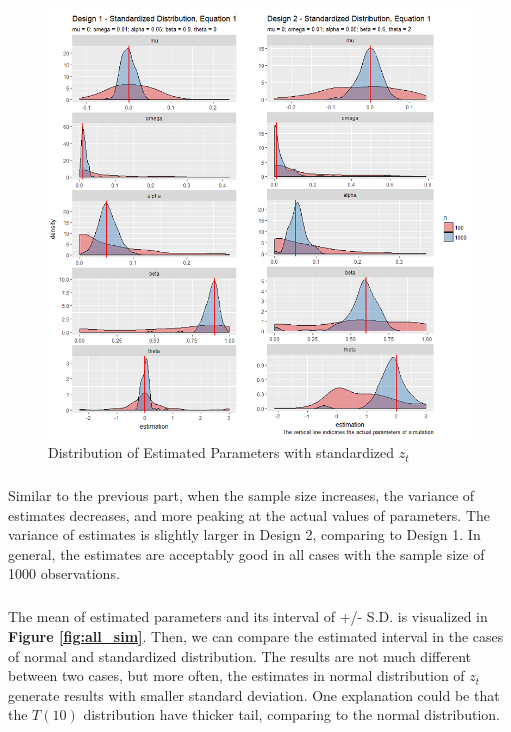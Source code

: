 \documentclass[a4paper]{article}
\begin{document}
\begin{figure}[h]
\centering
\includegraphics[height=0.5\textheight]{Std_eq1.png}
\caption{\label{fig:std_den} Distribution of Estimated Parameters with standardized $z_t$}
\end{figure}

\subparagraph*{}
Similar to the previous part, when the sample size increases, the variance of estimates decreases, and more peaking at the actual values of parameters. The variance of estimates is slightly larger in Design 2, comparing to Design 1. In general, the estimates are acceptably good in all cases with the sample size of 1000 observations. 

\subparagraph*{}
The mean of estimated parameters and its interval of +/- S.D. is visualized in \textbf{Figure \ref{fig:all_sim}}. Then, we can compare the estimated interval in the cases of normal and standardized distribution. The results are not much different between two cases, but more often, the estimates in normal distribution of $z_t$ generate results with smaller standard deviation. One explanation could be that the $T(10)$ distribution have thicker tail, comparing to the normal distribution. 
\end{document}
